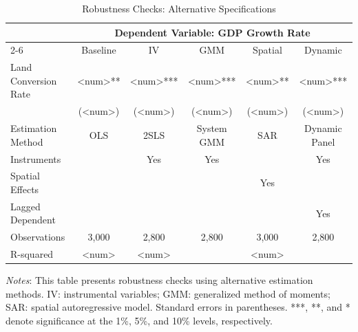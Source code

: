 \begin{table}[ht]
\centering
\caption{Robustness Checks: Alternative Specifications}
\label{tab:robustness}
\begin{tabular}{lccccc}
\toprule
 & \multicolumn{5}{c}{Dependent Variable: GDP Growth Rate} \\
\cmidrule(lr){2-6}
 & Baseline & IV & GMM & Spatial & Dynamic \\
\midrule
Land Conversion Rate & <num>** & <num>*** & <num>*** & <num>** & <num>*** \\
 & (<num>) & (<num>) & (<num>) & (<num>) & (<num>) \\
\midrule
Estimation Method & OLS & 2SLS & System GMM & SAR & Dynamic Panel \\
Instruments & & Yes & Yes & & Yes \\
Spatial Effects & & & & Yes & \\
Lagged Dependent & & & & & Yes \\
Observations & 3,000 & 2,800 & 2,800 & 3,000 & 2,800 \\
R-squared & <num> & <num> & & <num> & \\
\bottomrule
\end{tabular}
\begin{tablenotes}
\small
\item \textit{Notes}: This table presents robustness checks using alternative estimation methods. IV: instrumental variables; GMM: generalized method of moments; SAR: spatial autoregressive model. Standard errors in parentheses. ***, **, and * denote significance at the 1\%, 5\%, and 10\% levels, respectively.
\end{tablenotes}
\end{table}


